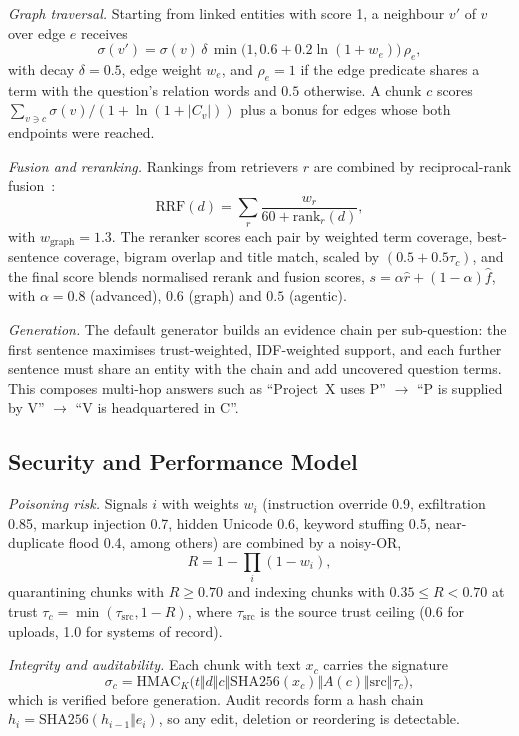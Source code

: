 \documentclass[journal]{IEEEtran}
\begin{document}
\textit{Graph traversal.} Starting from linked entities with score 1, a neighbour $v'$ of $v$ over edge
$e$ receives
\begin{equation}
\sigma(v')=\sigma(v)\,\delta\,\min\!\big(1,0.6+0.2\ln(1+w_e)\big)\,\rho_e,
\end{equation}
with decay $\delta=0.5$, edge weight $w_e$, and $\rho_e=1$ if the edge predicate shares a term with the
question's relation words and $0.5$ otherwise. A chunk $c$ scores
$\sum_{v\ni c}\sigma(v)/(1+\ln(1+|C_v|))$ plus a bonus for edges whose both endpoints were reached.

\textit{Fusion and reranking.} Rankings from retrievers $r$ are combined by reciprocal-rank
fusion~\cite{cormack2009rrf}:
\begin{equation}
\mathrm{RRF}(d)=\sum_{r} \frac{w_r}{60+\mathrm{rank}_r(d)},
\end{equation}
with $w_{\text{graph}}=1.3$. The reranker scores each pair by weighted term coverage, best-sentence
coverage, bigram overlap and title match, scaled by $(0.5+0.5\tau_c)$, and the final score blends
normalised rerank and fusion scores, $s=\alpha\hat{r}+(1-\alpha)\hat{f}$, with $\alpha=0.8$ (advanced),
$0.6$ (graph) and $0.5$ (agentic).

\textit{Generation.} The default generator builds an evidence chain per sub-question: the first sentence
maximises trust-weighted, IDF-weighted support, and each further sentence must share an entity with the
chain and add uncovered question terms. This composes multi-hop answers such as ``Project~X uses
P'' $\rightarrow$ ``P is supplied by V'' $\rightarrow$ ``V is headquartered in C''.

\subsection{Security and Performance Model}
\textit{Poisoning risk.} Signals $i$ with weights $w_i$ (instruction override 0.9, exfiltration 0.85,
markup injection 0.7, hidden Unicode 0.6, keyword stuffing 0.5, near-duplicate flood 0.4, among others)
are combined by a noisy-OR,
\begin{equation}
R=1-\prod_i (1-w_i),
\end{equation}
quarantining chunks with $R\ge0.70$ and indexing chunks with $0.35\le R<0.70$ at trust
$\tau_c=\min(\tau_{\text{src}},1-R)$, where $\tau_{\text{src}}$ is the source trust ceiling (0.6 for
uploads, 1.0 for systems of record).

\textit{Integrity and auditability.} Each chunk with text $x_c$ carries the signature
\begin{equation}
\sigma_c=\mathrm{HMAC}_K\big(t\Vert d\Vert c\Vert \mathrm{SHA256}(x_c)\Vert A(c)\Vert \mathrm{src}\Vert\tau_c\big),
\end{equation}
which is verified before generation. Audit records form a hash chain
$h_i=\mathrm{SHA256}(h_{i-1}\Vert e_i)$, so any edit, deletion or reordering is detectable.
\end{document}
